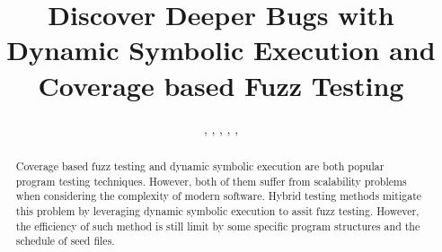 \documentclass{cta-author}
\begin{document}

\title{Discover Deeper Bugs with Dynamic Symbolic Execution and Coverage based Fuzz Testing}

\author{, , , , ,  }
%
\address{
}

\begin{abstract}
%
%
Coverage based fuzz testing and dynamic symbolic execution are both popular program testing techniques. However, both of them suffer from scalability problems when considering the complexity of modern software. Hybrid testing methods mitigate this problem by leveraging dynamic symbolic execution to assit fuzz testing. However, the efficiency of such method is still limit by some specific program structures and the schedule of seed files.


\end{abstract}
\end{document}
